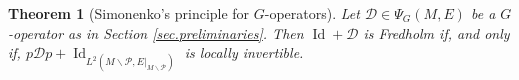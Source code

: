 \documentclass[10pt,a4paper]{amsart}
\newtheorem{theorem}{Theorem}
\newcommand{\maD}{\mathcal D}
\newcommand{\maK}{\mathcal K}
\newcommand{\maP}{\mathcal P}
\newcommand{\oid}{\operatorname{Id}}
\begin{document}
\begin{theorem}[Simonenko's principle for $G$-operators] \label{thm.Simonenko.Gop}
Let $\maD \in \Psi_{G}(M,E)$ be a $G$-operator as in Section \ref{sec.preliminaries}.
Then $\oid +\maD$ is Fredholm if, and only if, $p \maD p + \oid_{L^2(M\smallsetminus \maP , E\vert_{M\smallsetminus \maP})}$ is locally invertible.
\end{theorem}
\end{document}
